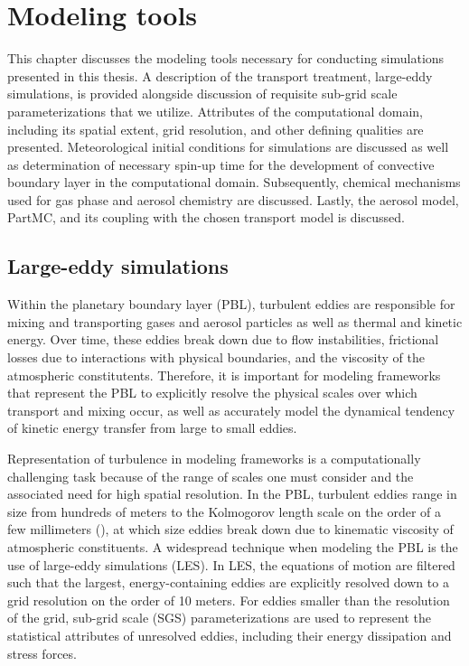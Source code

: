 \chapter{Modeling tools}
This chapter discusses the modeling tools necessary for conducting simulations presented in this thesis. A description of the transport treatment, large-eddy simulations, is provided alongside discussion of requisite sub-grid scale parameterizations that we utilize. Attributes of the computational domain, including its spatial extent, grid resolution, and other defining qualities are presented. Meteorological initial conditions for simulations are discussed as well as determination of necessary spin-up time for the development of convective boundary layer in the computational domain. Subsequently, chemical mechanisms used for gas phase and aerosol chemistry are discussed. Lastly, the aerosol model, PartMC, and its coupling with the chosen transport model is discussed. 

\section{Large-eddy simulations}
Within the planetary boundary layer (PBL), turbulent eddies are responsible for mixing and transporting gases and aerosol particles as well as thermal and kinetic energy. Over time, these eddies break down due to flow instabilities, frictional losses due to interactions with physical boundaries, and the viscosity of the atmospheric constitutents. Therefore, it is important for modeling frameworks that represent the PBL to explicitly resolve the physical scales over which transport and mixing occur, as well as accurately model the dynamical tendency of kinetic energy transfer from large to small eddies. 

Representation of turbulence in modeling frameworks is a computationally challenging task because of the range of scales one must consider and the associated need for high spatial resolution. In the PBL, turbulent eddies range in size from hundreds of meters to the Kolmogorov length scale on the order of a few millimeters (\cite{kolmogorov_local_1991}), at which size eddies break down due to kinematic viscosity of atmospheric constituents. A widespread technique when modeling the PBL is the use of large-eddy simulations (LES). In LES, the equations of motion are filtered such that the largest, energy-containing eddies are explicitly resolved down to a grid resolution on the order of 10 meters. For eddies smaller than the resolution of the grid, sub-grid scale (SGS) parameterizations are used to represent the statistical attributes of unresolved eddies, including their energy dissipation and stress forces.  

